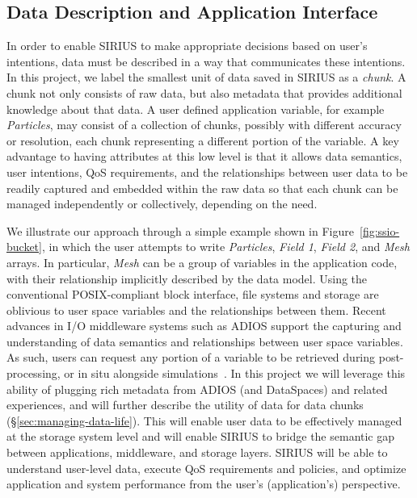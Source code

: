 \subsection{Data Description and Application Interface}
\label{sec:data-description}
In order to enable SIRIUS to make appropriate decisions based on user's intentions, data must be
described in a way that communicates these intentions.
 In this project, we label the smallest unit of data
saved in  SIRIUS as a \textit{chunk}.  A chunk not only consists of 
raw data, but also metadata that provides additional
knowledge about that data.
A user defined application variable, for example \textit{Particles}, may
consist of a collection of chunks, possibly with different accuracy or
resolution, each chunk representing a different portion of the variable.
A key advantage to having attributes at this low level is that it allows data
semantics, user intentions, QoS requirements, and the relationships between user
data to be readily captured and embedded within the raw data so that each chunk
can be managed independently or collectively, depending on the need.

  We illustrate our approach through a simple example shown in Figure~\ref{fig:ssio-bucket},
  in which the user attempts to write \textit{Particles}, \textit{Field 1},
  \textit{Field 2}, and \textit{Mesh} arrays. In particular, \textit{Mesh} can be a group
  of variables in the application code, with their relationship implicitly described
  by the data model. Using the conventional POSIX-compliant block interface, file
  systems and storage are oblivious to user space variables and the relationships between
  them. Recent advances in I/O middleware systems such as ADIOS \cite{liu_helloadios}
  support the capturing and understanding of data semantics and relationships between  
  user space variables. As such, users can request any portion of a variable to be retrieved
  during post-processing, or in situ alongside simulations~\cite{docan2012dataspaces}. 
  In this project we will leverage this ability of plugging rich metadata from ADIOS (and 
  DataSpaces) and related experiences, and will further describe the utility of data for data 
  chunks (\S\ref{sec:managing-data-life}). This will enable user data to 
  be effectively managed at the storage system level and will enable SIRIUS
%  
%   
to bridge the semantic gap between applications, middleware, and storage
layers. SIRIUS will be able to understand user-level data, execute QoS requirements and policies, and optimize 
application and system performance from the user's (application's) perspective.

